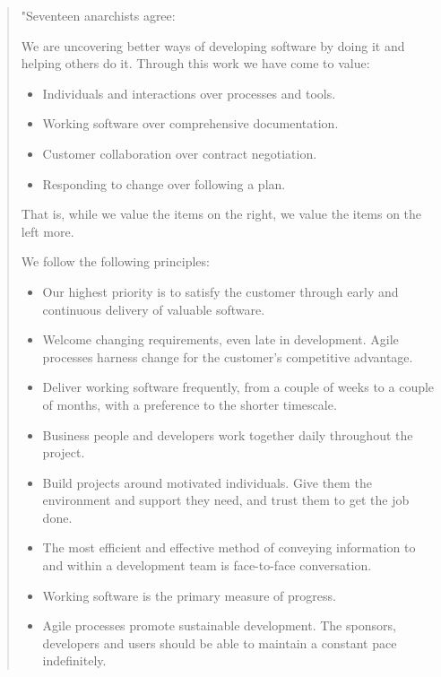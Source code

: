 \begin{quote}

	"Seventeen anarchists agree: 

	We are uncovering better ways of developing software by doing it and helping others do it. Through this work we have come to value: 

	\begin{itemize}
	\item Individuals and interactions over processes and tools.
	\item Working software over comprehensive documentation.
	\item Customer collaboration over contract negotiation.
	\item Responding to change over following a plan.
	\end{itemize}

	That is, while we value the items on the right, we value the items on the left more.

	We follow the following principles:
	\begin{itemize}
	\item Our highest priority is to satisfy the customer through early and continuous delivery of valuable software. 

	\item Welcome changing requirements, even late in development. Agile processes harness change for the customer's competitive advantage. 

	\item Deliver working software frequently, from a couple of weeks to a couple of months, with a preference to the shorter timescale. 

	\item Business people and developers work together daily throughout the project.  
	\item Build projects around motivated individuals. Give them the environment and support they need, and trust them to get the job done. 

	\item The most efficient and effective method of conveying information to and within a development team is face-to-face conversation. 

	\item Working software is the primary measure of progress.  
	\item Agile processes promote sustainable development. The sponsors, developers and users should be able to maintain a constant pace indefinitely. 


\end{itemize}
\end{quote}
